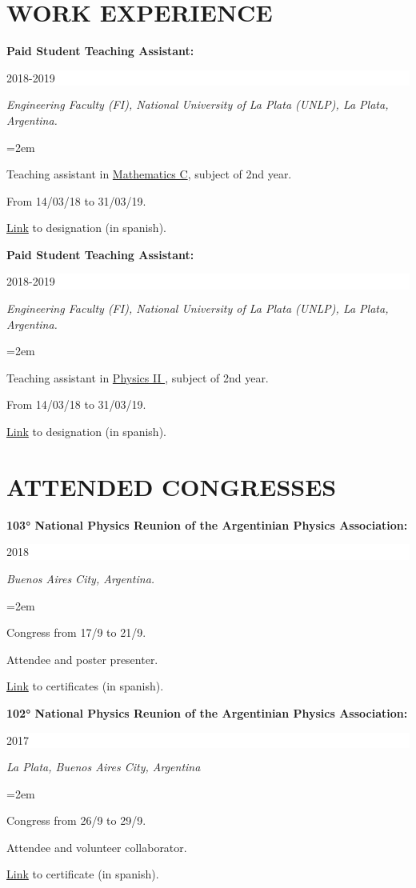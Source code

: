 \documentclass[paper=letter,fontsize=11pt]{scrartcl} %
\newcommand{\sepspace}{\vspace*{1em}}		%
\newcommand{\NewPart}[2]{\section*{\uppercase{#1} \small \normalfont #2}}
\newcommand{\WorkEntry}[5]{
		\noindent \textbf{#1}
        \noindent \small \textit{#2}
        \hfill      %
        \colorbox{White}{%
			\parbox{6em}{%
			\hfill\color{Black}#3}} \par  %
		\noindent \textit{#4} \par        %
		\noindent\hangindent=2em\hangafter=0 \small #5 %
		\normalsize \par}
\begin{document}
\NewPart{Work Experience}{}

\sepspace



\WorkEntry{Paid Student Teaching Assistant:}
{}{2018-2019}
{Engineering Faculty (FI), National University of La Plata (UNLP), La Plata, Argentina.}
{

Teaching assistant in {\href{https://www.ing.unlp.edu.ar/catedras/F0304/}{Mathematics C}}, subject of 2nd year.

From 14/03/18 to 31/03/19.

{\href{https://drive.google.com/drive/folders/1v960J-ofrC-xrrzCB4wOwtd4gdpVOSZy?usp=sharing}{Link} to designation (in spanish).}
}

\sepspace

\WorkEntry{Paid Student Teaching Assistant:}
{}{2018-2019}
{Engineering Faculty  (FI), National University of La Plata (UNLP), La Plata, Argentina.}
{

Teaching assistant in {\href{https://www.ing.unlp.edu.ar/catedras/F0305/}{Physics II  }}, subject of 2nd year.

From 14/03/18 to 31/03/19.

\href{https://drive.google.com/drive/folders/1vABkaZMn7Y_dWg1AbqDlz4lgAiekRv09?usp=sharing}{Link} to designation (in spanish).
}

\sepspace



\NewPart{Attended congresses}{}

\sepspace

\WorkEntry{103° National Physics Reunion of the Argentinian Physics Association:}{}{2018}{Buenos Aires City, Argentina.}{

Congress from 17/9 to 21/9.

Attendee and poster presenter.

{\href{https://drive.google.com/drive/folders/1WnbBy38R2___5leniTvo4lFK3aMaCwk7?usp=sharing}{Link}} to certificates (in spanish).
}


\newpage

\WorkEntry{102° National Physics Reunion of the Argentinian Physics Association:}{}{2017}{La Plata,  Buenos Aires City, Argentina}{

Congress from 26/9 to 29/9.

Attendee and volunteer collaborator.

{\href{https://drive.google.com/drive/folders/166mUi8z6QCz5kGK86sLKj27jQiXhEmrc?usp=sharing}{Link}} to certificate (in spanish).
}
\end{document}
